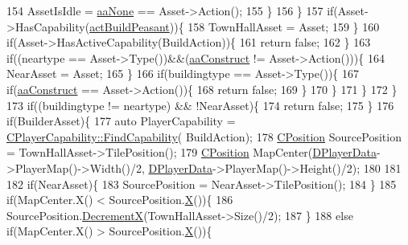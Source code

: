 \begin{DoxyCode}
154                     AssetIsIdle = \hyperlink{GameDataTypes_8h_ab47668e651a3032cfb9c40ea2d60d670ac17cc5a0035320c060d7f8074143b507}{aaNone} == Asset->Action();
155                 \}
156             \}
157             \textcolor{keywordflow}{if}(Asset->HasCapability(\hyperlink{GameDataTypes_8h_a35b98ce26aca678b03c6f9f76e4778cea66c601dce0fc095460b3c2c25f66ee71}{actBuildPeasant}))\{
158                 TownHallAsset = Asset;
159             \}
160             \textcolor{keywordflow}{if}(Asset->HasActiveCapability(BuildAction))\{
161                 \textcolor{keywordflow}{return} \textcolor{keyword}{false};    
162             \}
163             \textcolor{keywordflow}{if}((neartype == Asset->Type())&&(\hyperlink{GameDataTypes_8h_ab47668e651a3032cfb9c40ea2d60d670a7ef6b863f66dd7dcc95a199cd758ae1d}{aaConstruct} != Asset->Action()))\{
164                 NearAsset = Asset;
165             \}
166             \textcolor{keywordflow}{if}(buildingtype == Asset->Type())\{
167                 \textcolor{keywordflow}{if}(\hyperlink{GameDataTypes_8h_ab47668e651a3032cfb9c40ea2d60d670a7ef6b863f66dd7dcc95a199cd758ae1d}{aaConstruct} == Asset->Action())\{
168                     \textcolor{keywordflow}{return} \textcolor{keyword}{false};   
169                 \}
170             \}
171         \}
172     \}
173     \textcolor{keywordflow}{if}((buildingtype != neartype) && !NearAsset)\{
174         \textcolor{keywordflow}{return} \textcolor{keyword}{false};    
175     \}
176     \textcolor{keywordflow}{if}(BuilderAsset)\{
177         \textcolor{keyword}{auto} PlayerCapability = \hyperlink{classCPlayerCapability_a881ba4b87385d7cfe5cb6ced2d26f226}{CPlayerCapability::FindCapability}(
      BuildAction); 
178         \hyperlink{classCPosition}{CPosition} SourcePosition = TownHallAsset->TilePosition();
179         \hyperlink{classCPosition}{CPosition} MapCenter(\hyperlink{classCAIPlayer_a83b5113c8f7e80df54940b647c5ee2e6}{DPlayerData}->PlayerMap()->Width()/2, 
      \hyperlink{classCAIPlayer_a83b5113c8f7e80df54940b647c5ee2e6}{DPlayerData}->PlayerMap()->Height()/2);
180         
181         
182         \textcolor{keywordflow}{if}(NearAsset)\{
183             SourcePosition = NearAsset->TilePosition();
184         \}
185         \textcolor{keywordflow}{if}(MapCenter.X() < SourcePosition.\hyperlink{classCPosition_a9a6b94d3b91df1492d166d9964c865fc}{X}())\{
186             SourcePosition.\hyperlink{classCPosition_a64f0d8ef8ca26c8b66b0997b3b132416}{DecrementX}(TownHallAsset->Size()/2);   
187         \}
188         \textcolor{keywordflow}{else} \textcolor{keywordflow}{if}(MapCenter.X() > SourcePosition.\hyperlink{classCPosition_a9a6b94d3b91df1492d166d9964c865fc}{X}())\{

\end{DoxyCode}
